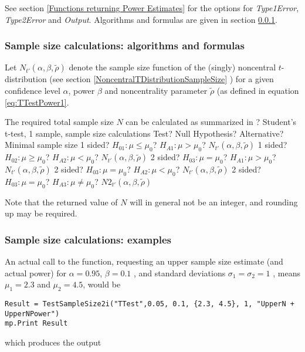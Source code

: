 \vspace{0.3cm}
See section \ref{Functions returning Power Estimates} for the options for {\itshape\sffamily Type1Error},  {\itshape\sffamily Type2Error} and {\itshape\sffamily Output}. Algorithms and formulas are given in section \ref{1SampleTTest_SampleSize}.



\subsubsection{Sample size calculations: algorithms and formulas}
\label{1SampleTTest_SampleSize}
Let $N_{t'}\left(\alpha, \beta, \widetilde{\rho} \right)$ denote the sample size function of the (singly) noncentral $t$-distribution (see section \ref{NoncentralTDistributionSampleSize} ) for a given confidence level $\alpha$, power $\beta$ and noncentrality parameter $\widetilde{\rho}$ (as defined in equation \ref{eq:TTestPower1}. 


\mpTableFourColsTwoRowsThreeRows
{The required total sample size $N$ can be calculated as summarized in ? Student's t-test, 1 sample, sample size calculations}
{Test? Null Hypothesis? Alternative? Minimal sample size}
{1 sided? $H_{01}: \mu \leq \mu_0$? $H_{A1}: \mu > \mu_0$? $N_{t'}\left(\alpha, \beta, \widetilde{\rho} \right)$}
{1 sided? $H_{02}: \mu \geq \mu_0$? $H_{A2}: \mu < \mu_0$? $N_{t'}\left(\alpha, \beta, \widetilde{\rho} \right)$}
{2 sided? $H_{03}: \mu = \mu_0$? $H_{A1}: \mu > \mu_0$? $N_{t'}\left(\alpha, \beta, \widetilde{\rho} \right)$}
{2 sided? $H_{03}: \mu = \mu_0$? $H_{A2}: \mu < \mu_0$? $N_{t'}\left(\alpha, \beta, \widetilde{\rho} \right)$}
{2 sided? $H_{03}: \mu = \mu_0$? $H_{A3}: \mu \neq \mu_0$? $N2_{t'}\left(\alpha, \beta, \widetilde{\rho} \right)$}

Note that the returned value of $N$ will in general not be an integer, and rounding up may be required.


\subsubsection{Sample size calculations: examples}
An actual call to the function, requesting an upper sample size estimate (and actual power) for $\alpha = 0.95$, $\beta=0.1$ , and standard deviations $\sigma_1=\sigma_2=1$ , means $\mu_1=2.3$ and $\mu_2=4.5$,   would be

\begin{lstlisting}
Result = TestSampleSize2i("TTest",0.05, 0.1, {2.3, 4.5}, 1, "UpperN + UpperNPower")
mp.Print Result
\end{lstlisting}
which produces the output

